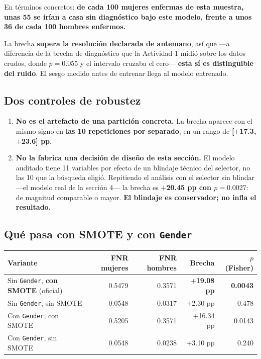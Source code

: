 \documentclass[10pt,a4paper]{article}
\begin{document}
En términos concretos: \textbf{de cada 100 mujeres enfermas de esta muestra, unas 55 se irían a casa sin diagnóstico bajo este modelo, frente a unos 36 de cada 100 hombres enfermos.}

La brecha \textbf{supera la resolución declarada de antemano}, así que ---a diferencia de la brecha de diagnóstico que la Actividad 1 midió sobre los datos crudos, donde $p = 0.055$ y el intervalo cruzaba el cero--- \textbf{esta sí es distinguible del ruido}. El sesgo medido antes de entrenar llega al modelo entrenado.

\subsection{Dos controles de robustez}

\begin{enumerate}
\item \textbf{No es el artefacto de una partición concreta.} La brecha aparece con el mismo signo en \textbf{las 10 repeticiones por separado}, en un rango de \textbf{[$+$17.3, $+$23.6] pp}.
\item \textbf{No la fabrica una decisión de diseño de esta sección.} El modelo auditado tiene 11 variables por efecto de un blindaje técnico del selector, no las 10 que la búsqueda eligió. Repitiendo el análisis con el selector sin blindar ---el modelo real de la sección 4--- la brecha es \textbf{$+$20.45 pp con $p = 0.0027$}: de magnitud comparable o mayor. \textbf{El blindaje es conservador; no infla el resultado.}
\end{enumerate}

\subsection{Qué pasa con SMOTE y con \texttt{Gender}}

\begin{table}[H]
\footnotesize
\centering
\begin{tabular}{@{}l r r r r@{}}
\toprule
\textbf{Variante} & \textbf{FNR mujeres} & \textbf{FNR hombres} & \textbf{Brecha} & \textbf{$p$ (Fisher)} \\
\midrule
Sin \texttt{Gender}, \textbf{con SMOTE} (oficial) & 0.5479 & 0.3571 & \textbf{$+$19.08 pp} & \textbf{0.0043} \\
Sin \texttt{Gender}, sin SMOTE & 0.0548 & 0.0317 & $+$2.30 pp & 0.478 \\
Con \texttt{Gender}, con SMOTE & 0.5205 & 0.3571 & $+$16.34 pp & 0.0143 \\
Con \texttt{Gender}, sin SMOTE & 0.0548 & 0.0238 & $+$3.10 pp & 0.240 \\
\bottomrule
\end{tabular}
\end{table}
\end{document}
